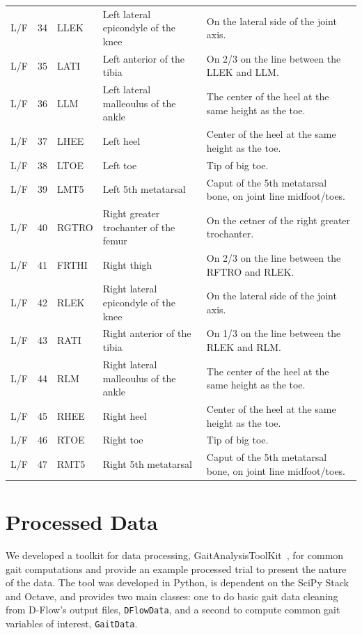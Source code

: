 \documentclass[fleqn,10pt]{wlpeerj}
\begin{document}
\begin{table}
\begin{tabular}{lrlll}
    L/F & 34 & LLEK  & Left lateral epicondyle of the knee   & On the lateral side of the joint axis. \\
    L/F & 35 & LATI  & Left anterior of the tibia            & On 2/3 on the line between the LLEK and LLM. \\
    L/F & 36 & LLM   & Left lateral malleoulus of the ankle  & The center of the heel at the same height as the toe. \\
    L/F & 37 & LHEE  & Left heel                             & Center of the heel at the same height as the toe. \\
    L/F & 38 & LTOE  & Left toe                              & Tip of big toe. \\
    L/F & 39 & LMT5  & Left 5th metatarsal                   & Caput of the 5th metatarsal bone, on joint line midfoot/toes. \\
    L/F & 40 & RGTRO & Right greater trochanter of the femur & On the cetner of the right greater trochanter. \\
    L/F & 41 & FRTHI & Right thigh                           & On 2/3 on the line between the RFTRO and RLEK. \\
    L/F & 42 & RLEK  & Right lateral epicondyle of the knee  & On the lateral side of the joint axis. \\
    L/F & 43 & RATI  & Right anterior of the tibia           & On 1/3 on the line between the RLEK and RLM. \\
    L/F & 44 & RLM   & Right lateral malleoulus of the ankle & The center of the heel at the same height as the toe. \\
    L/F & 45 & RHEE  & Right heel                            & Center of the heel at the same height as the toe. \\
    L/F & 46 & RTOE  & Right toe                             & Tip of big toe. \\
    L/F & 47 & RMT5  & Right 5th metatarsal                  & Caput of the 5th metatarsal bone, on joint line midfoot/toes. \\
    \bottomrule
  \end{tabular}
  \label{tab:marker-labels}
\end{table}

\section*{Processed Data}
%
We developed a toolkit for data processing,
GaitAnalysisToolKit~\cite{GATK2014}, for common gait computations and provide
an example processed trial to present the nature of the data. The tool was
developed in Python, is dependent on the SciPy Stack and Octave, and provides
two main classes: one to do basic gait data cleaning from D-Flow's output
files, \verb|DFlowData|, and a second to compute common gait variables of
interest, \verb|GaitData|.
\end{document}
